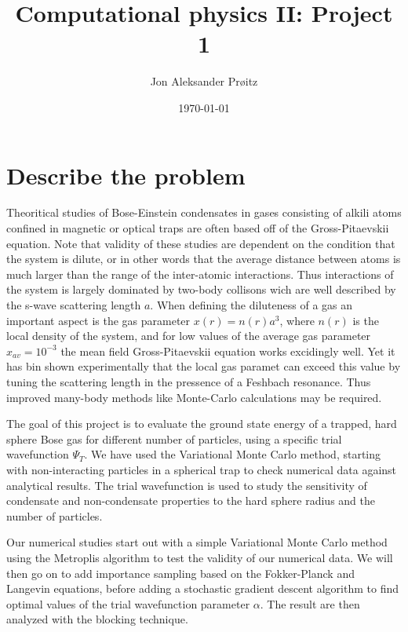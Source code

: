 \documentclass[a4paper, 10pt, english]{revtex4-2} %
\begin{document}
\vspace*{1.5cm}
\title{\LARGE Computational physics II: Project 1}
\author{Jon Aleksander Prøitz}
\date{\today}
\noaffiliation
\maketitle

\section*{\large Describe the problem}
    Theoritical studies of Bose-Einstein condensates in gases consisting of alkili atoms confined in magnetic or optical traps are often based off of the Gross-Pitaevskii equation. 
    Note that validity of these studies are dependent on the condition that the system is dilute, or in other words that the average distance between atoms is much larger than the range of the inter-atomic interactions. 
    Thus interactions of the system is largely dominated by two-body collisons wich are well described by the s-wave scattering length $a$.
    When defining the diluteness of a gas an important aspect is the gas parameter $x(r) = n(r)a^3$, where $n(r)$ is the local density of the system, and for low values of the average gas parameter $x_{av} = 10^{-3}$ the mean field Gross-Pitaevskii equation works excidingly well.
    Yet it has bin shown experimentally that the local gas paramet can exceed this value by tuning the scattering length in the pressence of a Feshbach resonance.
    Thus improved many-body methods like Monte-Carlo calculations may be required.


    The goal of this project is to evaluate the ground state energy of a trapped, hard sphere Bose gas for different number of particles, using a specific trial wavefunction $\Psi_T$.
    We have used the Variational Monte Carlo method, starting with non-interacting particles in a spherical trap to check numerical data against analytical results.
    The trial wavefunction is used to study the sensitivity of condensate and non-condensate properties to the hard sphere radius and the number of particles.

    Our numerical studies start out with a simple Variational Monte Carlo method using the Metroplis algorithm to test the validity of our numerical data.
    We will then go on to add importance sampling based on the Fokker-Planck and Langevin equations, before adding a stochastic gradient descent algorithm to find optimal values of the trial wavefunction parameter $\alpha$.
    The result are then analyzed with the blocking technique.
\end{document}
